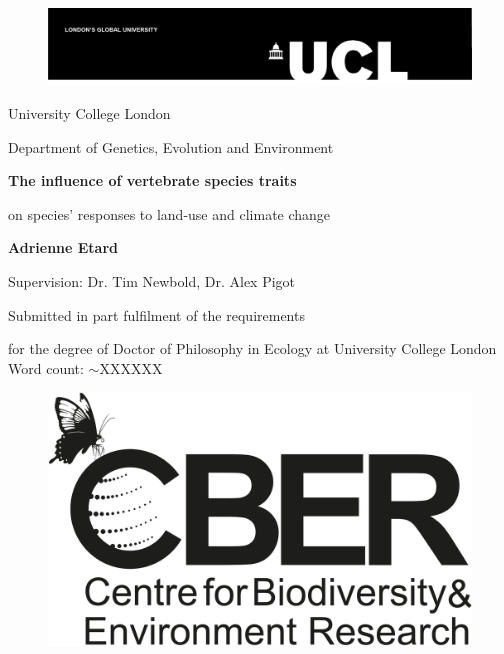 \date{\today}

\begin{titlepage}

\begin{figure}
{\includegraphics[scale=0.8]{UCL_logo}}
\end{figure}

\begin{center}

{\Large
University College London\par
Department of Genetics, Evolution and Environment\par
}
%
\vskip 3.5cm
%
{\huge \bf
The influence of vertebrate species traits  \par
on species' responses to land-use and climate change\par
}
%
\vskip 2cm
%
{\Large
\textbf{Adrienne Etard}\par
\vskip 1cm
Supervision: Dr. Tim Newbold, Dr. Alex Pigot

\vskip 1cm

\makeatletter
\@date
\vskip 0.5cm
\par
Submitted in part fulfilment of the requirements \par 
for the degree of Doctor of Philosophy in Ecology at University College London
\vskip 0.5cm
 Word count: $\sim$XXXXXX
\vskip 1cm
}
\end{center}
\begin{figure}[h!]
\centering
{\includegraphics[scale=0.09]{cber_logo}}
\end{figure}
\end{titlepage}

\makeatother